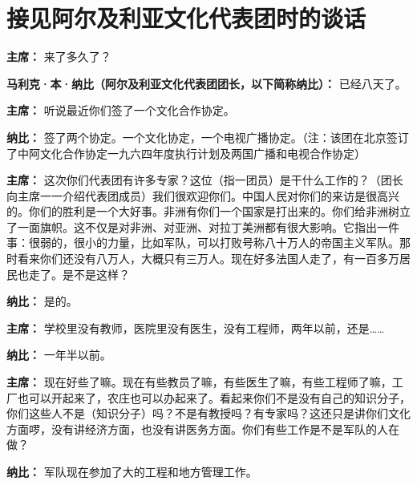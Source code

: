 \section[接见阿尔及利亚文化代表团时的谈话（一九六四年四月十五日）]{接见阿尔及利亚文化代表团时的谈话}

\begin{duihua}
    
\item[\textbf{主席：}] 来了多久了？

\item[\textbf{马利克·本·纳比（阿尔及利亚文化代表团团长，以下简称纳比）：}] 已经八天了。

\item[\textbf{主席：}] 听说最近你们签了一个文化合作协定。

\item[\textbf{纳比：}] 签了两个协定。一个文化协定，一个电视广播协定。（注：该团在北京签订了中阿文化合作协定一九六四年度执行计划及两国广播和电视合作协定）

\item[\textbf{主席：}] 这次你们代表团有许多专家？这位（指一团员）是干什么工作的？（团长向主席一一介绍代表团成员）我们很欢迎你们。中国人民对你们的来访是很高兴的。你们的胜利是一个大好事。非洲有你们一个国家是打出来的。你们给非洲树立了一面旗帜。这不仅是对非洲、对亚洲、对拉丁美洲都有很大影响。它指出一件事：很弱的，很小的力量，比如军队，可以打败号称八十万人的帝国主义军队。那时看来你们还没有八万人，大概只有三万人。现在好多法国人走了，有一百多万居民也走了。是不是这样？

\item[\textbf{纳比：}] 是的。

\item[\textbf{主席：}] 学校里没有教师，医院里没有医生，没有工程师，两年以前，还是……

\item[\textbf{纳比：}] 一年半以前。

\item[\textbf{主席：}] 现在好些了嘛。现在有些教员了嘛，有些医生了嘛，有些工程师了嘛，工厂也可以开起来了，农庄也可以办起来了。看起来你们不是没有自己的知识分子，你们这些人不是（知识分子）吗？不是有教授吗？有专家吗？这还只是讲你们文化方面啰，没有讲经济方面，也没有讲医务方面。你们有些工作是不是军队的人在做？

\item[\textbf{纳比：}] 军队现在参加了大的工程和地方管理工作。


\end{duihua}
